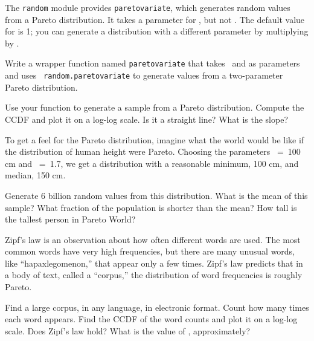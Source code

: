 \documentclass[12pt]{book}
\begin{document}
\begin{exercise}
The {\tt random} module provides {\tt paretovariate},
which generates random values from a Pareto distribution.  It takes
a parameter for \myalpha, but not \x{}.  The
default value for \x{} is 1; you can generate a distribution
with a different parameter by multiplying by \x{}.

Write a wrapper function named {\tt paretovariate} that takes
\myalpha~and \x {} as parameters and uses {\tt
  random.paretovariate} to generate values from a two-parameter Pareto
distribution.

Use your function to generate a sample from a Pareto distribution.
Compute the CCDF and plot it on a log-log scale.  Is it a straight
line?  What is the slope?

\end{exercise}

\begin{exercise}
To get a feel for the Pareto distribution, imagine what the world
would be like if the distribution of human height were Pareto.
Choosing the parameters \x {}~=~100 cm and \myalpha~=~1.7, we
get a distribution with a reasonable minimum, 100 cm,
and median, 150 cm.

Generate 6 billion random values from this distribution.  What is the
mean of this sample?  What fraction of the population is shorter than
the mean?  How tall is the tallest person in Pareto World?

\end{exercise}

\begin{exercise}
Zipf's law is an observation about how often different words are used.
The most common words have very high frequencies, but there are many
unusual words, like ``hapaxlegomenon,'' that appear only a few times.
Zipf's law predicts that in a body of text, called a ``corpus,'' the
distribution of word frequencies is roughly Pareto.

Find a large corpus, in any language, in electronic
format.  Count how many times each word appears.  Find the CCDF of the
word counts and plot it on a log-log scale.  Does Zipf's law hold?
What is the value of \myalpha, approximately?

\end{exercise}
\end{document}
